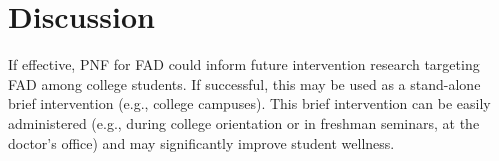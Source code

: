 \section{Discussion}

If effective, PNF for FAD could inform future intervention research targeting FAD among college students. If successful, this may be used as a stand-alone brief intervention (e.g., college campuses). This brief intervention can be easily administered (e.g., during college orientation or in freshman seminars, at the doctor’s office) and may significantly improve student wellness.